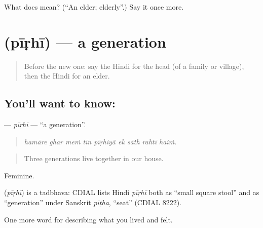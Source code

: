 \begin{tcolorbox}[breakable,colback=teal!4,colframe=teal!35!black,title={Before you move on}]
What does  mean? (\textquotedblleft{}An elder; elderly\textquotedblright{}.) Say it once more.
\end{tcolorbox}
\section[\texorpdfstring{\hi{पीढ़ी} (pīṛhī)}{पीढ़ी (pīṛhī)}]{ (pīṛhī) — a generation}

\label{lesson:HI-C503-pirhi}



\begin{quote}
Before the new one: say the Hindi for the head (of a family or village), then the Hindi for an elder.
\end{quote}

\subsection*{You'll want to know: }
\textbf{} — \emph{pīṛhī} — \textquotedblleft{}a generation\textquotedblright{}.

\begin{quote}
        
\end{quote}

\begin{quote}
\emph{hamāre ghar meṁ tīn pīṛhiyā̃ ek sāth rahtī haiṁ.}
\end{quote}

\begin{quote}
Three generations live together in our house.
\end{quote}

Feminine.

\begin{cousinweb}
\textbf{} (\emph{pīṛhī}) is a tadbhava: CDIAL lists Hindi \emph{pīṛhī} both as \textquotedblleft{}small square stool\textquotedblright{} and as \textquotedblleft{}generation\textquotedblright{} under Sanskrit \emph{pīṭha}, \textquotedblleft{}seat\textquotedblright{} (CDIAL 8222).
\end{cousinweb}

\begin{grammarlens}[title={What you've built}]
One more word for describing what you lived and felt.
\end{grammarlens}

